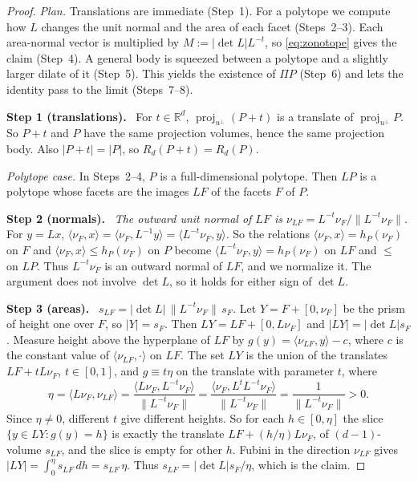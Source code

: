 \documentclass[11pt]{article}
\newcommand{\R}{\mathbb R}
\DeclareMathOperator{\proj}{proj}
\newcommand{\step}[1]{\par\smallskip\noindent\textbf{#1}\ }
\begin{document}
\begin{proof}
\emph{Plan.} Translations are immediate (Step~1). For a polytope we compute
how \(L\) changes the unit normal and the area of each facet (Steps~2--3).
Each area-normal vector is multiplied by \(M:=|\det L|L^{-t}\), so
\eqref{eq:zonotope} gives the claim (Step~4). A general body is squeezed
between a polytope and a slightly larger dilate of it (Step~5). This yields
the existence of \(\Pi P\) (Step~6) and lets the identity pass to the limit
(Steps~7--8).

\step{Step 1 (translations).} For \(t\in\R^d\),
\(\proj_{u^\perp}(P+t)\) is a translate of \(\proj_{u^\perp}P\). So \(P+t\)
and \(P\) have the same projection volumes, hence the same projection body.
Also \(|P+t|=|P|\), so \(R_d(P+t)=R_d(P)\).

\medskip\noindent\emph{Polytope case.} In Steps~2--4, \(P\) is a
full-dimensional polytope. Then \(LP\) is a polytope whose facets are the
images \(LF\) of the facets \(F\) of \(P\).

\step{Step 2 (normals).}
\emph{The outward unit normal of \(LF\) is
\(\nu_{LF}=L^{-t}\nu_F/\|L^{-t}\nu_F\|\).}
For \(y=Lx\),
\(\langle\nu_F,x\rangle=\langle\nu_F,L^{-1}y\rangle
=\langle L^{-t}\nu_F,y\rangle\). So the relations
\(\langle\nu_F,x\rangle=h_P(\nu_F)\) on \(F\) and
\(\langle\nu_F,x\rangle\le h_P(\nu_F)\) on \(P\) become
\(\langle L^{-t}\nu_F,y\rangle=h_P(\nu_F)\) on \(LF\) and \(\le\) on
\(LP\). Thus \(L^{-t}\nu_F\) is an outward normal of \(LF\), and we
normalize it. The argument does not involve \(\det L\), so it holds for
either sign of \(\det L\).

\step{Step 3 (areas).}
\emph{\(s_{LF}=|\det L|\,\|L^{-t}\nu_F\|\,s_F\).}
Let \(Y=F+[0,\nu_F]\) be the prism of height one over \(F\), so
\(|Y|=s_F\). Then \(LY=LF+[0,L\nu_F]\) and \(|LY|=|\det L|s_F\). Measure
height above the hyperplane of \(LF\) by
\(g(y)=\langle\nu_{LF},y\rangle-c\), where \(c\) is the constant value of
\(\langle\nu_{LF},\cdot\rangle\) on \(LF\). The set \(LY\) is the union of
the translates \(LF+tL\nu_F\), \(t\in[0,1]\), and \(g\equiv t\eta\) on the
translate with parameter \(t\), where
\[
 \eta=\langle L\nu_F,\nu_{LF}\rangle
 =\frac{\langle L\nu_F,L^{-t}\nu_F\rangle}{\|L^{-t}\nu_F\|}
 =\frac{\langle\nu_F,L^{t}L^{-t}\nu_F\rangle}{\|L^{-t}\nu_F\|}
 =\frac{1}{\|L^{-t}\nu_F\|}>0.
\]
Since \(\eta\ne0\), different \(t\) give different heights. So for each
\(h\in[0,\eta]\) the slice \(\{y\in LY:g(y)=h\}\) is exactly the translate
\(LF+(h/\eta)L\nu_F\), of \((d-1)\)-volume \(s_{LF}\), and the slice is
empty for other \(h\). Fubini in the direction \(\nu_{LF}\) gives
\(|LY|=\int_0^\eta s_{LF}\,dh=s_{LF}\,\eta\). Thus
\(s_{LF}=|\det L|s_F/\eta\), which is the claim.


\end{proof}
\end{document}
